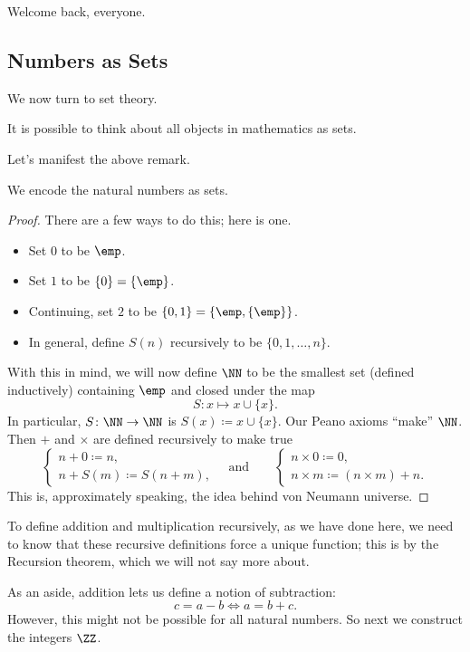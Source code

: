 
Welcome back, everyone.

\subsection{Numbers as Sets}
We now turn to set theory.
\begin{remark}
	It is possible to think about all objects in mathematics as sets.
\end{remark}
Let's manifest the above remark.
\begin{exe}
	We encode the natural numbers as sets.
\end{exe}
\begin{proof}
	There are a few ways to do this; here is one.
	\begin{itemize}
		\item Set $0$ to be $\emp$.
		\item Set $1$ to be $\{0\}=\{\emp\}$.
		\item Continuing, set $2$ to be $\{0,1\}=\{\emp,\{\emp\}\}$.
		\item In general, define $S(n)$ recursively to be $\{0,1,\ldots,n\}$.
	\end{itemize}
	With this in mind, we will now define $\NN$ to be the smallest set (defined inductively) containing $\emp$ and closed under the map
	\[S\colon x\mapsto x\cup\{x\}.\]
	In particular, $S\colon\NN\to\NN$ is $S(x)\coloneqq x\cup\{x\}$. Our Peano axioms ``make'' $\NN$. Then $+$ and $\times$ are defined recursively to make true
	\[\begin{cases}
		n+0\coloneqq n, \\
		n+S(m)\coloneqq S(n+m),
	\end{cases}\quad\text{and}\qquad\begin{cases}
		n\times0\coloneqq0, \\
		n\times m\coloneqq(n\times m)+n.
	\end{cases}\]
	This is, approximately speaking, the idea behind von Neumann universe.
\end{proof}
\begin{remark}
	To define addition and multiplication recursively, as we have done here, we need to know that these recursive definitions force a unique function; this is by the Recursion theorem, which we will not say more about.
\end{remark}
As an aside, addition lets us define a notion of subtraction:
\[c=a-b\iff a=b+c.\]
However, this might not be possible for all natural numbers. So next we construct the integers $\ZZ$.
